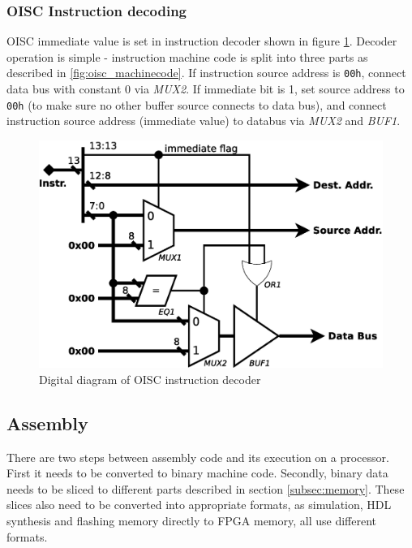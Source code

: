 \subsubsection{OISC Instruction decoding}
OISC immediate value is set in instruction decoder shown in figure \ref{fig:oisc_decoder}. Decoder operation is simple - instruction machine code is split into three parts as described in \ref{fig:oisc_machinecode}. If instruction source address is \texttt{00h}, connect data bus with constant 0 via \textit{MUX2}. If immediate bit is 1, set source address to \texttt{00h} (to make sure no other buffer source connects to data bus), and connect instruction source address (immediate value) to databus via \textit{MUX2} and \textit{BUF1}. 

\begin{figure}
	\centering
	\includegraphics[scale=0.4]{../resources/oisc_decoder.eps}
	\caption{Digital diagram of OISC instruction decoder}
	\label{fig:oisc_decoder}
\end{figure}

\subsection{Assembly}\label{subsec:assembly}

There are two steps between assembly code and its execution on a processor. First it needs to be converted to binary machine code. Secondly, binary data needs to be sliced to different parts described in section \ref{subsec:memory}. These slices also need to be converted into appropriate formats, as simulation, HDL synthesis and flashing memory directly to FPGA memory, all use different formats.


